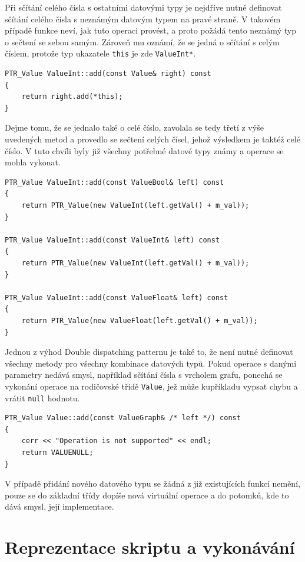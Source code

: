 \documentclass[11pt,twoside,a4paper]{book}
\begin{document}
Při sčítání celého čísla s ostatními datovými typy je nejdříve nutné definovat sčítání celého čísla s neznámým datovým typem na pravé straně. V takovém případě funkce neví, jak tuto operaci provést, a proto požádá tento neznámý typ o sečtení se sebou samým. Zároveň mu oznámí, že se jedná o sčítání s celým číslem, protože typ ukazatele \texttt{this} je zde \texttt{ValueInt*}.

\begin{verbatim}
PTR_Value ValueInt::add(const Value& right) const
{
    return right.add(*this);
}
\end{verbatim}

Dejme tomu, že se jednalo také o celé číslo, zavolala se tedy třetí z výše uvedených metod a provedlo se sečtení celých čísel, jehož výsledkem je taktéž celé číslo. V tuto chvíli byly již všechny potřebné datové typy známy a operace se mohla vykonat.

\begin{verbatim}
PTR_Value ValueInt::add(const ValueBool& left) const
{
    return PTR_Value(new ValueInt(left.getVal() + m_val));
}

PTR_Value ValueInt::add(const ValueInt& left) const
{
    return PTR_Value(new ValueInt(left.getVal() + m_val));
}

PTR_Value ValueInt::add(const ValueFloat& left) const
{
    return PTR_Value(new ValueFloat(left.getVal() + m_val));
}
\end{verbatim}

Jednou z výhod Double dispatching patternu je také to, že není nutné definovat všechny metody pro všechny kombinace datových typů. Pokud operace s danými parametry nedává smysl, například sčítání čísla s vrcholem grafu, ponechá se vykonání operace na rodičovské třídě \texttt{Value}, jež může kupříkladu vypsat chybu a vrátit \texttt{null} hodnotu.

\begin{verbatim}
PTR_Value Value::add(const ValueGraph& /* left */) const
{
    cerr << "Operation is not supported" << endl;
    return VALUENULL;
}
\end{verbatim}

V případě přidání nového datového typu se žádná z již existujících funkcí nemění, pouze se do základní třídy dopíše nová virtuální operace a do potomků, kde to dává smysl, její implementace.


\section{Reprezentace skriptu a vykonávání}
\end{document}
